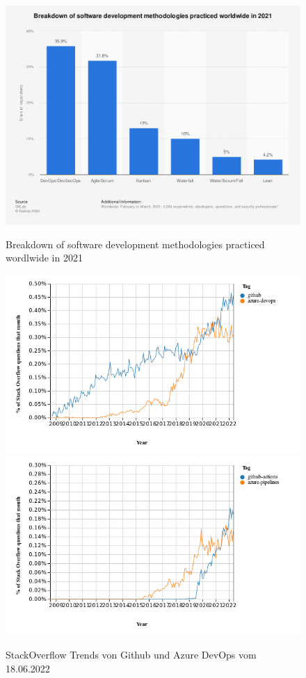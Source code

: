 \begin{figure}[b!]
	{\caption{Breakdown of software development methodologies practiced wordlwide in 2021}
		\label{FIG:devops-important}}
	{\includegraphics[width=1\textwidth]{figures/devops-important.png}}
\end{figure}

\begin{figure}[b!]
	{\caption{StackOverflow Trends von Github und Azure DevOps vom 18.06.2022}
		\label{FIG:github_azuredevops}}
	{  \includegraphics[width=1\textwidth]{figures/github_azuredevops.png}
	\includegraphics[width=1\textwidth]{figures/githubactions_azurepipelines.png}}
\end{figure}


